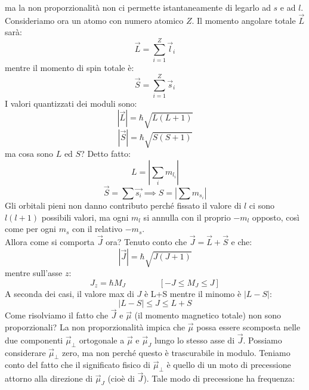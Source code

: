 \documentclass{book}
\begin{document}
    ma la non proporzionalità non ci permette istantaneamente di legarlo ad $s$ e ad $l$. \\
    Consideriamo ora un atomo con numero atomico $Z$. Il momento angolare totale $\vec{L}$ sarà:
    \begin{equation}
        \vec{L} = \sum_{i=1} ^{Z} \vec{l}_{i}
    \end{equation}
    mentre il momento di spin totale è:
    \begin{equation}
        \vec{S} = \sum_{i=1} ^{Z} \vec{s}_{i}
    \end{equation}
    I valori quantizzati dei moduli sono:
    \begin{equation}
        |\vec{L}| = \hbar \sqrt{L(L+1)}
    \end{equation}
    \begin{equation}
        |\vec{S}| = \hbar \sqrt{S(S+1)}
    \end{equation}
    ma cosa sono $L$ ed $S$? Detto fatto:
    \begin{equation}
        L = |\sum_{i} m_{l_{i}}|
    \end{equation}
    \begin{equation}
        \vec{S} = \sum \vec{s_{i}} \implies S = |\sum m_{s_{i}}|
     \end{equation}
     Gli orbitali pieni non danno contributo perché fissato il valore di $l$ ci sono $l(l+1)$ possibili valori, ma ogni $m_{l}$ si annulla con il proprio $-m_{l}$ opposto, così come per ogni $m_{s}$ con il relativo $-m_{s}$. \\
     Allora come si comporta $\vec{J}$ ora? Tenuto conto che $\vec{J} = \vec{L} + \vec{S}$ e che:
     \begin{equation}
         |\vec{J}| = \hbar \sqrt{J(J+1)}
     \end{equation}
     mentre sull'asse $z$:
     \begin{equation}
         J_{z} = \hbar M_{J} \qquad \qquad [-J \leq M_{J} \leq J]
     \end{equation}
     A seconda dei casi, il valore max di $J$ è L+S mentre il minomo è $|L-S|$:
     \begin{equation}
         |L-S| \leq J \leq L+S
     \end{equation}
     Come risolviamo il fatto che $\vec{J}$ e $\vec{\mu}$ (il momento magnetico totale) non sono proporzionali? La non proporzionalità impica che $\vec{\mu}$ possa essere scomposta nelle due componenti $\vec{\mu}_{\perp}$ ortogonale a $\vec{\mu}$ e $\vec{\mu}_{J}$ lungo lo stesso asse di $\vec{J}$. Possiamo considerare $\vec{\mu}_{\perp}$ zero, ma non perché questo è trascurabile in modulo. Teniamo conto del fatto che il significato fisico di $\vec{\mu}_{\perp}$ è quello di un moto di precessione attorno alla direzione di $\vec{\mu}_{J}$ (cioè di $\vec{J}$). Tale modo di precessione ha frequenza:
\end{document}
